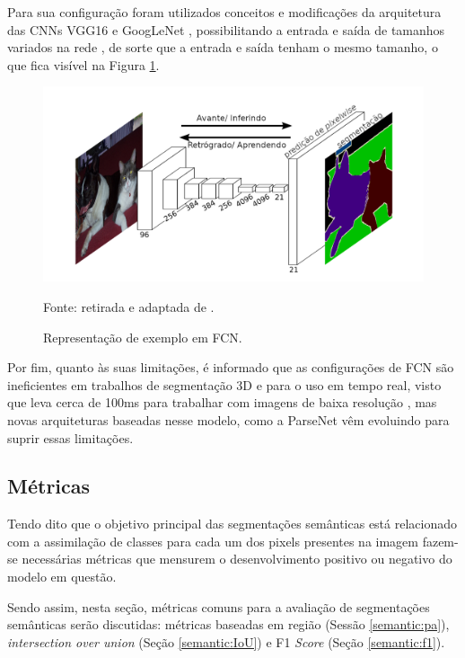 Para sua configuração foram utilizados conceitos e modificações da arquitetura das CNNs VGG16 \cite{Simonyan2015} e GoogLeNet \cite{Szegedy2015}, possibilitando a entrada e saída de tamanhos variados na rede \cite{Minaee2021}, de sorte que a entrada e saída tenham o mesmo tamanho, o que fica visível na Figura \ref{semantic:fig:6}.

\begin{figure}[H]
    \centering
    \caption{Representação de exemplo em FCN.}
    \includegraphics[width=1\linewidth]{recursos/imagens/semantic/fcn_example.png}
    \label{semantic:fig:6}

    \vspace*{1 cm}
    Fonte: retirada e adaptada de \cite{Shelhamer2016}.
\end{figure}

Por fim, quanto às suas limitações, é informado que as configurações de FCN são ineficientes em trabalhos de segmentação 3D e para o uso em tempo real, visto que leva cerca de 100ms para trabalhar com imagens de baixa resolução \cite{Minaee2021}, mas novas arquiteturas baseadas nesse modelo, como a ParseNet \cite{Liu2015} vêm evoluindo para suprir essas limitações.


\subsection{Métricas}
\label{semantic:metrics}

Tendo dito que o objetivo principal das segmentações semânticas está relacionado com a assimilação de classes para cada um dos pixels presentes na imagem \cite{Csurka} fazem-se necessárias métricas que mensurem o desenvolvimento positivo ou negativo do modelo em questão.

Sendo assim, nesta seção, métricas comuns para a avaliação de segmentações semânticas serão discutidas: métricas baseadas em região (Sessão \ref{semantic:pa}), \textit{intersection over union} (Seção \ref{semantic:IoU}) e F1 \textit{Score} (Seção \ref{semantic:f1}).


